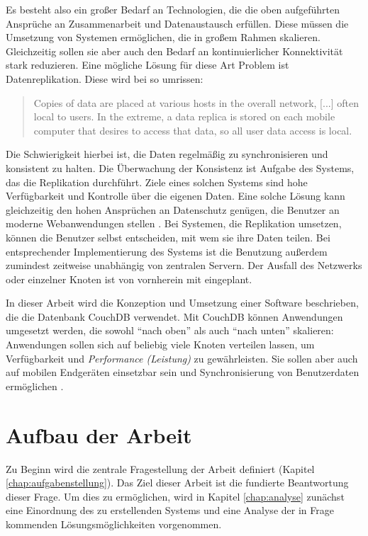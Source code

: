 Es besteht also ein großer Bedarf an Technologien, die die oben aufgeführten Ansprüche an Zusammenarbeit und Datenaustausch erfüllen. Diese müssen die Umsetzung von Systemen ermöglichen, die in großem Rahmen skalieren. Gleichzeitig sollen sie aber auch den Bedarf an kontinuierlicher Konnektivität stark reduzieren. Eine mögliche Lösung für diese Art Problem ist Datenreplikation. Diese wird bei  so umrissen: 

\begin{quote}
Copies of data are placed at various hosts in the overall network, [...] often local to users. In the extreme, a data replica is stored on each mobile computer that desires to access that data, so all user data access is local.
\end{quote}

Die Schwierigkeit hierbei ist, die Daten regelmäßig zu synchronisieren und konsistent zu halten. Die Überwachung der Konsistenz ist Aufgabe des Systems, das die Replikation durchführt. Ziele eines solchen Systems sind hohe Verfügbarkeit und Kontrolle über die eigenen Daten. Eine solche Lösung kann gleichzeitig den hohen Ansprüchen an Datenschutz genügen, die Benutzer an moderne Webanwendungen stellen . Bei Systemen, die Replikation umsetzen, können die Benutzer selbst entscheiden, mit wem sie ihre Daten teilen. Bei entsprechender Implementierung des Systems ist die Benutzung außerdem zumindest zeitweise unabhängig von zentralen Servern. Der Ausfall des Netzwerks oder einzelner Knoten ist von vornherein mit eingeplant. 

In dieser Arbeit wird die Konzeption und Umsetzung einer Software beschrieben, die die Datenbank CouchDB verwendet. Mit CouchDB können Anwendungen umgesetzt werden, die sowohl \enquote{nach oben} als auch \enquote{nach unten} skalieren: Anwendungen sollen sich auf beliebig viele Knoten verteilen lassen, um Verfügbarkeit und \textit{Performance (Leistung)} zu gewährleisten. Sie sollen aber auch auf mobilen Endgeräten einsetzbar sein und Synchronisierung von Benutzerdaten ermöglichen .





\section{Aufbau der Arbeit}


Zu Beginn wird die zentrale Fragestellung der Arbeit definiert (Kapitel \ref{chap:aufgabenstellung}). Das Ziel dieser Arbeit ist die fundierte Beantwortung dieser Frage. Um dies zu ermöglichen, wird in Kapitel \ref{chap:analyse} zunächst eine Einordnung des zu erstellenden Systems und eine Analyse der in Frage kommenden Lösungsmöglichkeiten vorgenommen. 

